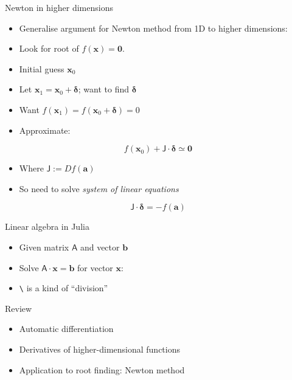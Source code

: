 \begin{frame}{Newton in higher dimensions}
\protect\hypertarget{newton-in-higher-dimensions}{}

\begin{itemize}
\item
  Generalise argument for Newton method from 1D to higher dimensions:
\item
  Look for root of \(f(\mathbf{x}) = \mathbf{0}\).
\item
  Initial guess \(\mathbf{x}_0\)
\item
  Let \(\mathbf{x}_1 = \mathbf{x}_0 + \pmb{\delta}\); want to find
  \(\pmb{\delta}\)
\end{itemize}

\end{frame}

\begin{frame}{}
\protect\hypertarget{section-1}{}

\begin{itemize}
\item
  Want \(f(\mathbf{x}_1) = f(\mathbf{x}_0 + \pmb{\delta}) = 0\)
\item
  Approximate:
\end{itemize}

\[f(\mathbf{x}_0) + \mathsf{J} \cdot \pmb{\delta} \simeq \mathbf{0}\]

\begin{itemize}
\item
  Where \(\mathsf{J} := Df(\mathbf{a})\)
\item
  So need to solve \emph{system of linear equations}
\end{itemize}

\[ \mathsf{J} \cdot \pmb{\delta} = -f(\mathbf{a}) \]

\end{frame}

\begin{frame}[fragile]{Linear algebra in Julia}
\protect\hypertarget{linear-algebra-in-julia}{}

\begin{itemize}
\item
  Given matrix \(\mathsf{A}\) and vector \(\mathbf{b}\)
\item
  Solve \(\mathsf{A} \cdot \mathbf{x} = \mathbf{b}\) for vector
  \(\mathbf{x}\):

\begin{Shaded}
\begin{Highlighting}[]
\end{Highlighting}
\end{Shaded}
\item
  \texttt{\textbackslash{}} is a kind of ``division''
\end{itemize}

\end{frame}

\begin{frame}{Review}
\protect\hypertarget{review}{}

\begin{itemize}
\item
  Automatic differentiation
\item
  Derivatives of higher-dimensional functions
\item
  Application to root finding: Newton method
\end{itemize}

\end{frame}
